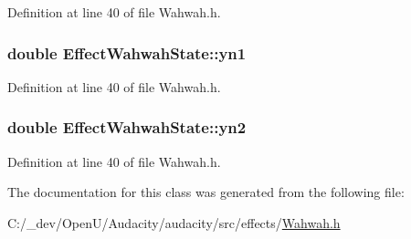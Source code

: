 Definition at line 40 of file Wahwah.\+h.

\subsubsection[{\texorpdfstring{yn1}{yn1}}]{\setlength{\rightskip}{0pt plus 5cm}double Effect\+Wahwah\+State\+::yn1}\hypertarget{class_effect_wahwah_state_a65da4693cd2f45328665e651447dd0e5}{}\label{class_effect_wahwah_state_a65da4693cd2f45328665e651447dd0e5}


Definition at line 40 of file Wahwah.\+h.

\subsubsection[{\texorpdfstring{yn2}{yn2}}]{\setlength{\rightskip}{0pt plus 5cm}double Effect\+Wahwah\+State\+::yn2}\hypertarget{class_effect_wahwah_state_a0752d59300e29e0370df5aa3ea93667c}{}\label{class_effect_wahwah_state_a0752d59300e29e0370df5aa3ea93667c}


Definition at line 40 of file Wahwah.\+h.



The documentation for this class was generated from the following file\+:\begin{DoxyCompactItemize}
\item 
C\+:/\+\_\+dev/\+Open\+U/\+Audacity/audacity/src/effects/\hyperlink{_wahwah_8h}{Wahwah.\+h}\end{DoxyCompactItemize}
